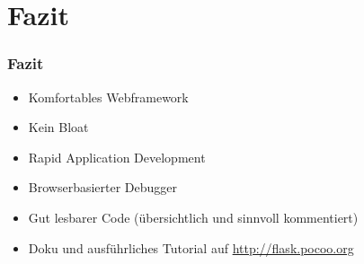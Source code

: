 \documentclass{beamer}
\begin{document}
\section{Fazit}
\begin{frame}
  \frametitle{Fazit}
  \begin{itemize}
    \item Komfortables Webframework
    \item Kein Bloat
    \item Rapid Application Development
    \item Browserbasierter Debugger
    \item Gut lesbarer Code (übersichtlich und sinnvoll kommentiert)
    \item Doku und ausführliches Tutorial auf \url{http://flask.pocoo.org}
  \end{itemize}
\end{frame}
\end{document}
